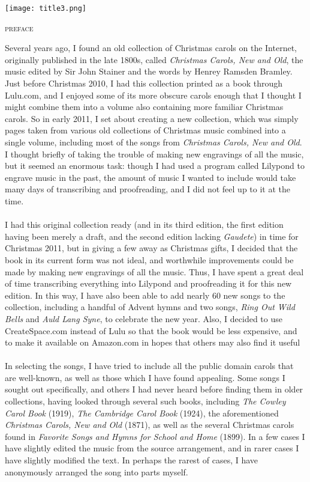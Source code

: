 \documentclass[letterpaper,12pt]{book} %
\begin{document}
\pagebreak
\vspace*{0pt}
\vfill
\noindent
\texttt{[image: title3.png]}%
\vfill
\pagebreak
\begin{center}
\fontsize{19}{19}\selectfont
\textsc{preface}
\end{center}
Several years ago, I found an old collection of Christmas carols on the Internet, originally published in the late 1800s, called \emph{Christmas Carols, New and Old}, the music edited by Sir John Stainer and the words by Henrey Ramsden Bramley.  Just before Christmas 2010, I had this collection printed as a book through Lulu.com, and I enjoyed some of its more obscure carols enough that I thought I might combine them into a volume also containing more familiar Christmas carols.  So in early 2011, I set about creating a new collection, which was simply pages taken from various old collections of Christmas music combined into a single volume, including most of the songs from \emph{Christmas Carols, New and Old}.  I thought briefly of taking the trouble of making new engravings of all the music, but it seemed an enormous task: though I had used a program called Lilypond to engrave music in the past, the amount of music I wanted to include would take many days of transcribing and proofreading, and I did not feel up to it at the time.\\
\\
I had this original collection ready (and in its third edition, the first edition having been merely a draft, and the second edition lacking \emph{Gaudete}) in time for Christmas 2011, but in giving a few away as Christmas gifts, I decided that the book in its current form was not ideal, and worthwhile improvements could be made by making new engravings of all the music.  Thus, I have spent a great deal of time transcribing everything into Lilypond and proofreading it for this new edition.  In this way, I have also been able to add nearly 60 new songs to the collection, including a handful of Advent hymns and two songs, \emph{Ring Out Wild Bells} and \emph{Auld Lang Syne}, to celebrate the new year.  Also, I decided to use CreateSpace.com instead of Lulu so that the book would be less expensive, and to make it available on Amazon.com in hopes that others may also find it useful\\
\\
In selecting the songs, I have tried to include all the public domain carols that are well-known, as well as those which I have found appealing.  Some songs I sought out specifically, and others I had never heard before finding them in older collections, having looked through several such books, including \emph{The Cowley Carol Book} (1919), \emph{The Cambridge Carol Book} (1924), the aforementioned \emph{Christmas Carols, New and Old} (1871), as well as the several Christmas carols found in \emph{Favorite Songs and Hymns for School and Home} (1899).  In a few cases I have slightly edited the music from the source arrangement, and in rarer cases I have slightly modified the text.  In perhaps the rarest of cases, I have anonymously arranged the song into parts myself.\\
\end{document}
